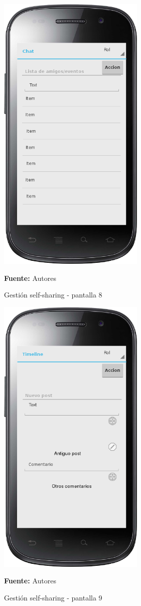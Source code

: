 \begin{figure}[!htb]
  \begin{center}
    \includegraphics[width=7cm]{./imagenes/UI/Self_sharing/self_sharing_8.png}
    \caption{Gestión self-sharing - pantalla 8}
    \label{fig:self_sharing_8}
    \textbf{Fuente:}  Autores
  \end{center}
\end{figure}

\begin{figure}[!htb]
  \begin{center}
    \includegraphics[width=7cm]{./imagenes/UI/Self_sharing/self_sharing_9.png}
    \caption{Gestión self-sharing - pantalla 9}
    \label{fig:self_sharing_9}
    \textbf{Fuente:}  Autores
  \end{center}
\end{figure}

